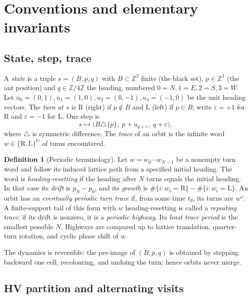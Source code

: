 \documentclass[11pt,reqno]{amsart}
\theoremstyle{plain}
\theoremstyle{definition}
\newtheorem{definition}[theorem]{Definition}
\newcommand{\Z}{\mathbb{Z}}
\newcommand{\N}{\mathbb{N}}
\newcommand{\turnR}{\mathrm{R}}
\newcommand{\turnL}{\mathrm{L}}
\begin{document}
\section{Conventions and elementary invariants}\label{sec:prelim}

\subsection{State, step, trace}
A \emph{state} is a triple $s=(B,p,q)$ with $B\subset\Z^2$ finite (the black
set), $p\in\Z^2$ (the ant position) and $q\in\Z/4\Z$ the heading, numbered
$0=N,1=E,2=S,3=W$. Let $u_0=(0,1),u_1=(1,0),u_2=(0,-1),u_3=(-1,0)$ be the unit
heading vectors. The \emph{turn at $s$} is $\turnR$ (right) if $p\notin B$ and
$\turnL$ (left) if $p\in B$; write $\varepsilon=+1$ for $\turnR$ and
$\varepsilon=-1$ for $\turnL$. One step is
\[
s\mapsto\bigl(B\triangle\{p\},\; p+u_{q+\varepsilon},\; q+\varepsilon\bigr),
\]
where $\triangle$ is symmetric difference. The \emph{trace} of an orbit is the
infinite word $w\in\{\turnR,\turnL\}^{\N}$ of turns encountered.

\begin{definition}[Periodic terminology]\label{def:periodic}
Let $w=w_0\cdots w_{N-1}$ be a nonempty turn word and follow its induced lattice
path from a specified initial heading. The word is \emph{heading-resetting} if the
heading after $N$ turns equals the initial heading. In that case its \emph{drift} is
$p_N-p_0$, and its \emph{growth} is
$\#\{i:w_i=\turnR\}-\#\{i:w_i=\turnL\}$. An orbit has an \emph{eventually periodic
turn trace} if, from some time $t_0$, its turns are $w^\omega$. A finite-support
tail of this form with $w$ heading-resetting is called a \emph{repeating trace}; if
its drift is nonzero, it is a \emph{periodic highway}. Its \emph{least trace period}
is the smallest possible $N$. Highways are compared up to lattice translation,
quarter-turn rotation, and cyclic phase shift of $w$.
\end{definition}

The dynamics is reversible: the pre-image of $(B,p,q)$ is obtained by stepping
backward one cell, recolouring, and undoing the turn; hence orbits never merge.

\subsection{HV partition and alternating visits}
\end{document}
